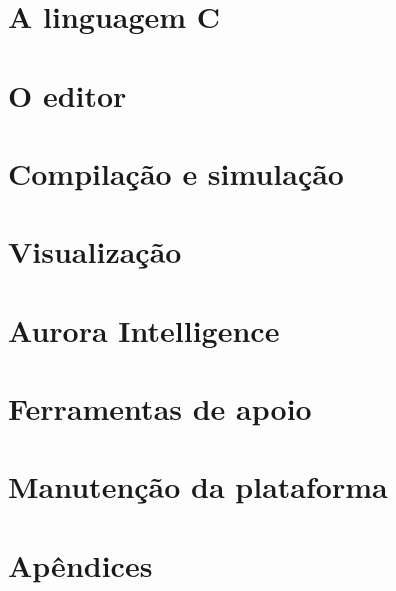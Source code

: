 \documentclass[11pt,a4paper,twoside,openright]{book}
\newcommand{\cmm}{C\textpm{}}
\begin{document}
\part{A linguagem \cmm{}}





\part{O editor}


\part{Compilação e simulação}




\part{Visualização}



\part{Aurora Intelligence}


\part{Ferramentas de apoio}



\part{Manutenção da plataforma}



\appendix
\part{Apêndices}




\end{document}
